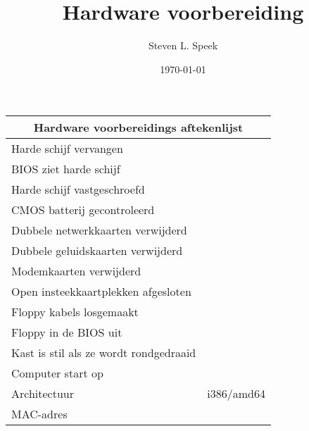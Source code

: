 \documentclass[12pt,a4paper]{article}
\begin{document}
\lstset{language=bash}      
\author{Steven L. Speek}
\title{Hardware voorbereiding}
\date{\today}

\begin{tabular}{|l|p{6cm}|}
	\hline
	\multicolumn{2}{|c|}{\textbf{Hardware voorbereidings aftekenlijst}}\\
	\hline
	Harde schijf vervangen &   \\
	\hline
	BIOS ziet harde schijf &   \\
	\hline
	Harde schijf vastgeschroefd &   \\
	\hline
	CMOS batterij gecontroleerd &   \\
	\hline
	Dubbele netwerkkaarten verwijderd &   \\
	\hline
	Dubbele geluidskaarten verwijderd &   \\
	\hline
	Modemkaarten verwijderd  &   \\
	\hline
	Open insteekkaartplekken afgesloten &   \\
	\hline
	Floppy kabels losgemaakt &   \\
	\hline
	Floppy in de BIOS uit &   \\
	\hline
	Kast is stil als ze wordt rondgedraaid &   \\
	\hline
	Computer start op &   \\
	\hline
	\hline
	Architectuur & i386/amd64 \\
	\hline
	MAC-adres & \\
	\hline
\end{tabular}
\end{document}
